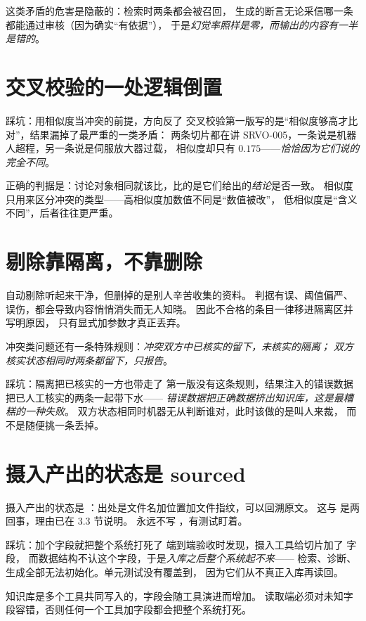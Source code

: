 这类矛盾的危害是隐蔽的：检索时两条都会被召回，
生成的断言无论采信哪一条都能通过审核（因为确实“有依据”），
于是\emph{幻觉率照样是零，而输出的内容有一半是错的}。

\section{交叉校验的一处逻辑倒置}

\begin{keynote}{踩坑：用相似度当冲突的前提，方向反了}
交叉校验第一版写的是“相似度够高才比对”，结果漏掉了最严重的一类矛盾：
两条切片都在讲 SRVO-005，一条说是机器人超程，另一条说是伺服放大器过载，
相似度却只有 $0.175$——\emph{恰恰因为它们说的完全不同}。

正确的判据是：讨论对象相同就该比，比的是它们给出的\emph{结论}是否一致。
相似度只用来区分冲突的类型——高相似度加数值不同是“数值被改”，
低相似度是“含义不同”，后者往往更严重。
\end{keynote}

\section{剔除靠隔离，不靠删除}

自动剔除听起来干净，但删掉的是别人辛苦收集的资料。
判据有误、阈值偏严、误伤，都会导致内容悄悄消失而无人知晓。
因此不合格的条目一律移进隔离区并写明原因，
只有显式加参数才真正丢弃。

冲突类问题还有一条特殊规则：\emph{冲突双方中已核实的留下，未核实的隔离；
双方核实状态相同时两条都留下，只报告}。

\begin{keynote}{踩坑：隔离把已核实的一方也带走了}
第一版没有这条规则，结果注入的错误数据把已人工核实的两条一起带下水——
\emph{错误数据把正确数据挤出知识库，这是最糟糕的一种失败}。
双方状态相同时机器无从判断谁对，此时该做的是叫人来裁，
而不是随便挑一条丢掉。
\end{keynote}

\section{摄入产出的状态是 sourced}

摄入产出的状态是 ：出处是文件名加位置加文件指纹，可以回溯原文。
这与  是两回事，理由已在 3.3 节说明。
 永远不写 ，有测试盯着。

\begin{keynote}{踩坑：加个字段就把整个系统打死了}
端到端验收时发现，摄入工具给切片加了  字段，
而数据结构不认这个字段，于是\emph{入库之后整个系统起不来}——
检索、诊断、生成全部无法初始化。单元测试没有覆盖到，
因为它们从不真正入库再读回。

知识库是多个工具共同写入的，字段会随工具演进而增加。
读取端必须对未知字段容错，否则任何一个工具加字段都会把整个系统打死。
\end{keynote}



